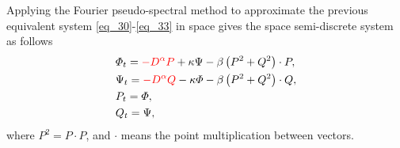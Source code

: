 \documentclass[preprint,compress,3p,10pt,fleqn]{elsarticle}
\numberwithin{equation}{section}
\newtheorem{remark}[theorem]{Remark}
\begin{document}

	

Applying the Fourier pseudo-spectral method to approximate the previous equivalent system \eqref{eq_30}-\eqref{eq_33} in space gives the space semi-discrete system as follows
\begin{align}
&\varPhi_{t}=\textcolor[rgb]{1.00,0.00,0.00}{-D^{\alpha}P}+\kappa \Psi-\beta \left( P^{2}+Q^{2}\right)\cdot P,\label{eq_56}\\
&\Psi_{t}=\textcolor[rgb]{1.00,0.00,0.00}{-D^{\alpha}Q}-\kappa \varPhi-\beta \left( P^{2}+Q^{2}\right)\cdot Q,\label{eq_57}\\
&P_t=\varPhi,\label{eq_58}\\
&Q_t=\Psi,\label{eq_59}
\end{align}
where $P^{2}=P \cdot P$, and $\cdot$ means the point multiplication between vectors.
\end{document}
